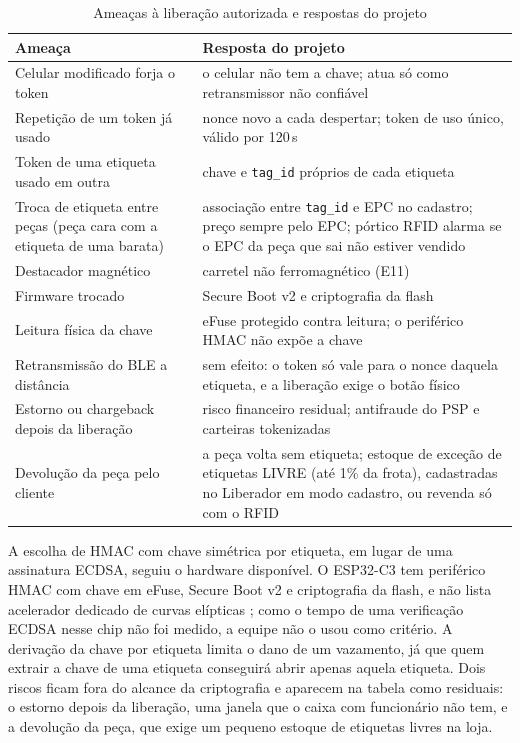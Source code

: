 \begin{table}[htbp]
    \centering
    \caption{Ameaças à liberação autorizada e respostas do projeto}
    \label{tab:r2-ameacas}
    \footnotesize
    \renewcommand{\arraystretch}{1.25}
    \begin{tabularx}{\textwidth}{@{}
        >{\RaggedRight\arraybackslash}p{5.0cm}
        >{\RaggedRight\arraybackslash}X@{}}
        \toprule
        \textbf{Ameaça} & \textbf{Resposta do projeto} \\
        \midrule
        Celular modificado forja o token & o celular não tem a chave; atua só como retransmissor não confiável \\
        Repetição de um token já usado & nonce novo a cada despertar; token de uso único, válido por 120\,s \\
        Token de uma etiqueta usado em outra & chave e \texttt{tag\_id} próprios de cada etiqueta \\
        Troca de etiqueta entre peças (peça cara com a etiqueta de uma barata) & associação entre \texttt{tag\_id} e EPC no cadastro; preço sempre pelo EPC; pórtico RFID alarma se o EPC da peça que sai não estiver vendido \\
        Destacador magnético & carretel não ferromagnético (E11) \\
        Firmware trocado & Secure Boot v2 e criptografia da flash \\
        Leitura física da chave & eFuse protegido contra leitura; o periférico HMAC não expõe a chave \\
        Retransmissão do BLE a distância & sem efeito: o token só vale para o nonce daquela etiqueta, e a liberação exige o botão físico \\
        Estorno ou chargeback depois da liberação & risco financeiro residual; antifraude do PSP e carteiras tokenizadas \\
        Devolução da peça pelo cliente & a peça volta sem etiqueta; estoque de exceção de etiquetas LIVRE (até 1\% da frota), cadastradas no Liberador em modo cadastro, ou revenda só com o RFID \\
        \bottomrule
    \end{tabularx}
\end{table}

A escolha de HMAC com chave simétrica por etiqueta, em lugar de uma assinatura ECDSA, seguiu o hardware disponível. O ESP32-C3 tem periférico HMAC com chave em eFuse, Secure Boot v2 e criptografia da flash, e não lista acelerador dedicado de curvas elípticas \cite{espressif2026esp32c3, espressif2026secureboot}; como o tempo de uma verificação ECDSA nesse chip não foi medido, a equipe não o usou como critério. A derivação da chave por etiqueta limita o dano de um vazamento, já que quem extrair a chave de uma etiqueta conseguirá abrir apenas aquela etiqueta. Dois riscos ficam fora do alcance da criptografia e aparecem na tabela como residuais: o estorno depois da liberação, uma janela que o caixa com funcionário não tem, e a devolução da peça, que exige um pequeno estoque de etiquetas livres na loja.

